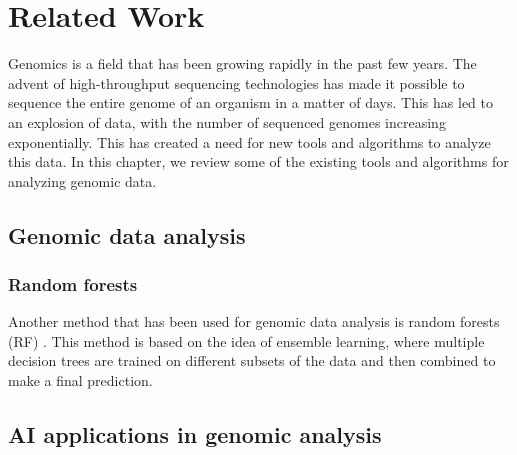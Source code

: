\chapter{Related Work}
\label{chap:related-work}

Genomics is a field that has been growing rapidly in the past few years. The advent of high-throughput
sequencing technologies has made it possible to sequence the entire genome of an organism in a matter
of days. This has led to an explosion of data, with the number of sequenced genomes increasing exponentially.
This has created a need for new tools and algorithms to analyze this data. In this chapter, we review 
some of the existing tools and algorithms for analyzing genomic data.

\section{Genomic data analysis}
\label{sec:genomic-data-analysis}

\subsection{Random forests}
\label{subsec:random-forests}

Another method that has been used for genomic data analysis is random forests (RF) \cite{Chen-Ishwaran-2012}.
This method is based on the idea of ensemble learning, where multiple decision trees are trained on different
subsets of the data and then combined to make a final prediction.

\section{AI applications in genomic analysis}
\label{sec:ai-applications-in-genomic-analysis}
